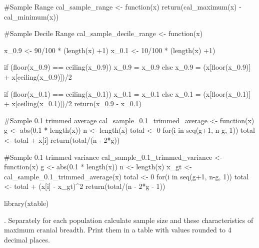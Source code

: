 \documentclass[12pt, oneside]{report}\usepackage[]{graphicx}\usepackage[]{color}
\begin{document}
\begin{Schunk}
\begin{Sinput}
#Sample Range
cal_sample_range <- function(x){
  return(cal_maximum(x) - cal_minimum(x))
}

#Sample Decile Range
cal_sample_decile_range <- function(x){
  x_0.9 <- 90/100 * (length(x) +1)
  x_0.1 <- 10/100 * (length(x) +1)
  
  if (floor(x_0.9) == ceiling(x_0.9)){
    x_0.9 = x_0.9
  }else{
    x_0.9 = (x[floor(x_0.9)] + x[ceiling(x_0.9)])/2
  }
  
  if (floor(x_0.1) == ceiling(x_0.1)){
    x_0.1 = x_0.1
  }else{
    x_0.1 = (x[floor(x_0.1)] + x[ceiling(x_0.1)])/2
  }
  return(x_0.9 - x_0.1)
}

#Sample 0.1 trimmed average
cal_sample_0.1_trimmed_average <- function(x){
  g <- abs(0.1 * length(x))
  n <- length(x)
  total <- 0
  for(i in seq(g+1, n-g, 1)){
    total <- total + x[i]
  }
  return(total/(n - 2*g))
}

#Sample 0.1 trimmed variance
cal_sample_0.1_trimmed_variance <- function(x){
   g <- abs(0.1 * length(x))
   n <- length(x)
   x_gt <- cal_sample_0.1_trimmed_average(x)
   total <- 0
   for(i in seq(g+1, n-g, 1)){
     total <- total + (x[i] - x_gt)^2
   }
   return(total/(n - 2*g - 1))
}

library(xtable)
\end{Sinput}
\end{Schunk}

. Separately for each population calculate sample size and these characteristics of maximum cranial breadth. Print them in a table with values rounded to 4 decimal places.
\end{document}
